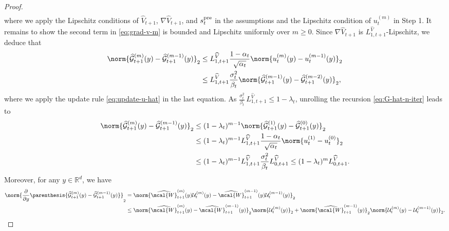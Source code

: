 \documentclass{article}
\newcommand{\R}{\mathbb{R}}
\begin{document}
\begin{proof}
\begin{align}
\end{align}
where we apply the Lipschitz conditions of $\widehat{V}_{t+1}$, $ \nabla \widehat{V}_{t+1}$, and $s_t^{\rm pre}$ in the assumptions and the Lipschitz condition of $u_t^{(m)}$ in Step 1. 
It remains to show the second term in \eqref{eq:grad-v-m} is bounded and Lipschitz uniformly over $m \geq 0$. Since $\nabla \widehat{V}_{t+1}$ is $L_{1, t+1}^{\widehat{V}}$-Lipschitz, we deduce that 
\begin{align}
\norm{\widehat{\mathcal{G}}_{t+1}^{(m)}(y)-\widehat{\mathcal{G}}_{t+1}^{(m-1)}(y)}_2 & \leq L_{1, t+1}^{\widehat{V}} \frac{1 - \alpha_{t}}{\sqrt{\alpha_{t}}}\norm{u_{t}^{(m)}(y) - u_{t}^{(m-1)}(y)}_2 \nonumber \\ & \leq L_{1, t+1}^{\widehat{V}}\frac{\sigma_{t}^{2}}{\beta_{t}}\norm{\widehat{\mathcal{G}}_{t+1}^{(m-1)}(y)-\widehat{\mathcal{G}}_{t+1}^{(m-2)}(y)}_2,\label{eq:G-hat-n-iter}
\end{align}
where we apply the update rule \eqref{eq:update-u-hat} in the last equation.
As $\frac{\sigma_{t}^{2}}{\beta_{t}}\,L_{1, t+1}^{\widehat{V}} \leq 1 - \lambda_t$, unrolling the recursion \eqref{eq:G-hat-n-iter} leads to
\begin{align}
   \norm{\widehat{\mathcal{G}}_{t+1}^{(m)}(y)-\widehat{\mathcal{G}}_{t+1}^{(m-1)}(y)}_2 & \leq ( 1- \lambda_t)^{m-1} \norm{\widehat{\mathcal{G}}_{t+1}^{(1)}(y)-\widehat{\mathcal{G}}_{t+1}^{(0)}(y)}_2 \nonumber \\ & \leq ( 1- \lambda_t)^{m-1}  L_{1, t+1}^{\widehat{V}} \frac{1 - \alpha_{t}}{\sqrt{\alpha_{t}}}\norm{u_{t}^{(1)} - u_{t}^{(0)}}_2 \nonumber \\ & \leq ( 1- \lambda_t)^{m-1}L_{1, t+1}^{\widehat{V}} \frac{\sigma_t^2}{\beta_t}L_{0, t+1}^{\widehat{V}} \leq ( 1- \lambda_t)^{m}L_{0, t+1}^{\widehat{V}}.\label{eq:G-hat-G-n-bound}
\end{align}
Moreover, for any $ y \in \R^{d} $, we have
\begin{align}
    \norm{\frac{\partial}{\partial y} \parenthesis{\widehat{\mathcal{G}}_{t+1}^{(m)}(y)-\widehat{\mathcal{G}}_{t+1}^{(m-1)}(y)}}_2 & = \norm{\widehat{\mcal{W}}_{t+1}^{{(m)}}(y)\mathcal{U}^{(m)}_t(y) - \widehat{\mcal{W}}_{t+1}^{{(m-1)}}(y)\mathcal{U}^{(m-1)}_t(y)}_2 \nonumber \\ & \leq \norm{\widehat{\mcal{W}}_{t+1}^{{(m)}}(y) - \widehat{\mcal{W}}_{t+1}^{{(m-1)}}(y)}_2\norm{\mathcal{U}^{(m)}_t(y)}_2 + \norm{\widehat{\mcal{W}}_{t+1}^{{(m-1)}}(y)}_2\norm{\mathcal{U}^{(m)}_t(y) - \mathcal{U}^{(m-1)}_t(y)}_2. \label{eq:grad-Gm-diff}
\end{align}

\end{proof}
\end{document}
